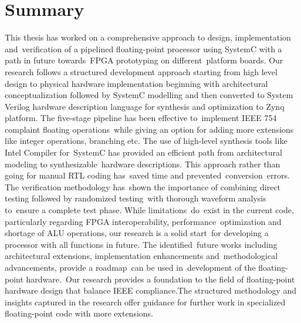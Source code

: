 
\chapter{Summary}
\label{chap:summary}

This thesis has worked on a comprehensive approach to design, implementation and verification of a pipelined floating-point processor using SystemC with a path in future towards FPGA prototyping on different platform boards. Our research follows a structured development approach starting from high level design to physical hardware implementation beginning with architectural conceptualization followed by SystemC modelling and then converted to System Verilog hardware description language for synthesis and optimization to Zynq platform. The five-stage pipeline has been effective to implement IEEE 754 complaint floating operations while giving an option for adding more extensions like integer operations, branching etc. The use of high-level synthesis tools like Intel Compiler for SystemC has provided an efficient path from architectural modeling to synthesizable hardware descriptions. This approach rather than going for manual RTL coding has saved time and prevented conversion errors. The verification methodology has shown the importance of combining direct testing followed by randomized testing with thorough waveform analysis to ensure a complete test phase. While limitations do exist in the current code, particularly regarding FPGA interoperability, performance optimization and shortage of ALU operations, our research is a solid start for developing a processor with all functions in future. The identified future works including architectural extensions, implementation enhancements and methodological advancements, provide a roadmap can be used in development of the floating-point hardware. Our research provides a foundation to the field of floating-point hardware design that balance IEEE compliance.The structured methodology and insights captured in the research offer guidance for further work in specialized floating-point code with more extensions.